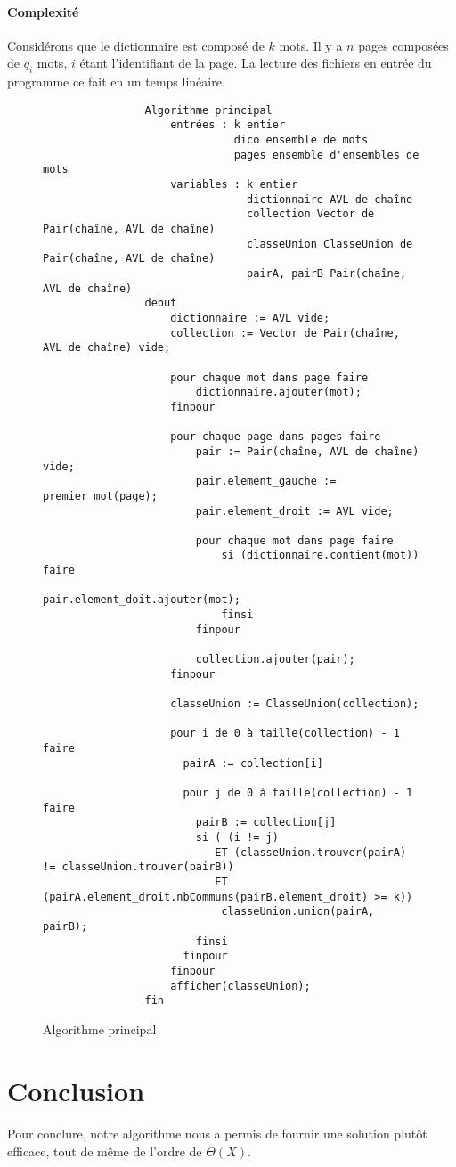 \documentclass[a4paper]{article}
\begin{document}
		 	\paragraph{Complexité}{
		 	Considérons que le dictionnaire est composé de $k$ mots. Il y a $n$ pages composées de
		 	$q_{i}$ mots, $i$ étant l'identifiant de la page. \newline
		 	La lecture des fichiers en entrée du programme ce fait en un temps linéaire.
		 	}
   			\begin{figure}
	    	    \begin{verbatim}
	    	    Algorithme principal
	    	        entrées : k entier
	    	                  dico ensemble de mots
	    	                  pages ensemble d'ensembles de mots
	    	        variables : k entier
	    	                    dictionnaire AVL de chaîne
	    	                    collection Vector de Pair(chaîne, AVL de chaîne)
	    	                    classeUnion ClasseUnion de Pair(chaîne, AVL de chaîne)
	    	                    pairA, pairB Pair(chaîne, AVL de chaîne)
	    	    debut
	    	        dictionnaire := AVL vide;
	    	        collection := Vector de Pair(chaîne, AVL de chaîne) vide;
	    	        
	    	        pour chaque mot dans page faire
	    	            dictionnaire.ajouter(mot);
	    	        finpour
	    	            
	    	        pour chaque page dans pages faire
	    	            pair := Pair(chaîne, AVL de chaîne) vide;
	    	            pair.element_gauche := premier_mot(page);
	    	            pair.element_droit := AVL vide;
	    	            
	    	            pour chaque mot dans page faire
	    	                si (dictionnaire.contient(mot)) faire
	    	                    pair.element_doit.ajouter(mot);
	    	                finsi
	    	            finpour
	    	            
	    	            collection.ajouter(pair);
	    	        finpour
	    	        
	    	        classeUnion := ClasseUnion(collection);
	    	        
	    	        pour i de 0 à taille(collection) - 1 faire
	    	          pairA := collection[i]
	    	            
	    	          pour j de 0 à taille(collection) - 1 faire
	    	            pairB := collection[j]
	    	            si ( (i != j)
	    	               ET (classeUnion.trouver(pairA) != classeUnion.trouver(pairB))
	    	               ET (pairA.element_droit.nbCommuns(pairB.element_droit) >= k))
	    	                classeUnion.union(pairA, pairB);
	    	            finsi
	    	          finpour
	    	        finpour
	    	        afficher(classeUnion);
	    	    fin
	    	    \end{verbatim}
   	    	\caption{Algorithme principal \label{algo_main}}
   	    	\end{figure}
			
	\section*{Conclusion}
		\paragraph{}{
		Pour conclure, notre algorithme nous a permis de fournir une solution plutôt efficace, tout de
		même de l'ordre de $\Theta(X)$.
		}
		
\end{document}
